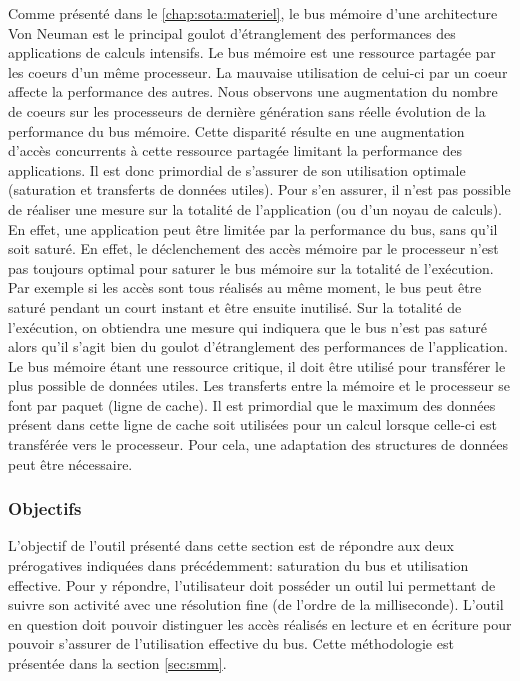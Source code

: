         Comme présenté dans le \autoref{chap:sota:materiel}, le bus mémoire d'une architecture Von Neuman est le principal goulot d'étranglement des performances des applications de calculs intensifs\cite{Drepper2007}. Le bus mémoire est une ressource partagée par les coeurs d'un même processeur. La mauvaise utilisation de celui-ci par un coeur affecte la performance des autres. Nous observons une augmentation du nombre de coeurs sur les processeurs de dernière génération sans réelle évolution de la performance du bus mémoire. Cette disparité résulte en une augmentation d'accès concurrents à cette ressource partagée limitant la performance des applications. Il est donc primordial de s'assurer de son utilisation optimale (saturation et transferts de données utiles). Pour s'en assurer, il n'est pas possible de réaliser une mesure sur la totalité de l'application (ou d'un noyau de calculs). En effet, une application peut être limitée par la performance du bus, sans qu'il soit saturé. En effet, le déclenchement des accès mémoire par le processeur n’est pas toujours optimal pour saturer le bus mémoire sur la totalité de l'exécution. Par exemple si les accès sont tous réalisés au même moment, le bus peut être saturé pendant un court instant et être ensuite inutilisé. Sur la totalité de l'exécution, on obtiendra une mesure qui indiquera que le bus n'est pas saturé alors qu'il s'agit bien du goulot d'étranglement des performances de l'application. Le bus mémoire étant une ressource critique, il doit être utilisé pour transférer le plus possible de données utiles. Les transferts entre la mémoire et le processeur se font  par paquet (ligne de cache). Il est primordial que le maximum des données présent dans cette ligne de cache soit utilisées pour un calcul lorsque celle-ci est transférée vers le processeur. Pour cela, une adaptation des structures de données peut être nécessaire.
    
    \subsubsection{Objectifs}
    
        L'objectif de l'outil présenté dans cette section est de répondre aux deux prérogatives indiquées dans précédemment: saturation du bus et utilisation effective. Pour y répondre, l'utilisateur doit posséder un outil lui permettant de suivre son activité avec une résolution fine (de l'ordre de la milliseconde). L'outil en question doit pouvoir distinguer les accès réalisés en lecture et en écriture pour pouvoir s'assurer de l'utilisation effective du bus. Cette méthodologie est présentée dans la section \autoref{sec:smm}.

